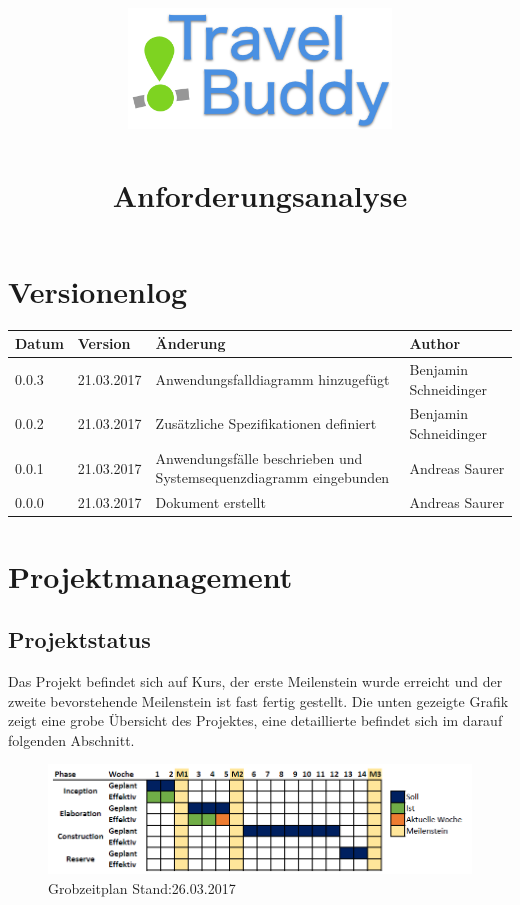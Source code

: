 \documentclass[a4paper,10pt,xetex]{article}
\title{
  \includegraphics[width=7cm]{travel-buddy_white}\\[\bigskipamount]\\
  Anforderungsanalyse\\[\bigskipamount]
}
\author{\documentauthors}
\date{\parbox{\linewidth}{\centering%
  IT15TA ZH \hspace*{3cm} Gruppe 3\endgraf\bigskip
  \documentdate\endgraf
}}
\begin{document}
\maketitle
\newpage

{
\hypersetup{linkcolor=black}
\setcounter{tocdepth}{3}
\tableofcontents
}
\newpage

\section{Versionenlog}\label{versionenlog}

\tabulinesep=1.2mm

\begin{longtabu} to \textwidth { | l | l | X[l] | l | }
  \hline
  \textbf{Datum} & \textbf{Version} & \textbf{Änderung} & \textbf{Author} \\
  \hline
  \endhead

  0.0.3 & 21.03.2017 & Anwendungsfalldiagramm hinzugefügt & Benjamin Schneidinger\\
  \hline

  0.0.2 & 21.03.2017 & Zusätzliche Spezifikationen definiert & Benjamin Schneidinger\\
  \hline

  0.0.1 & 21.03.2017 & Anwendungsfälle beschrieben und Systemsequenzdiagramm eingebunden & Andreas Saurer\\
  \hline

  0.0.0 & 21.03.2017 & Dokument erstellt & Andreas Saurer\\
  \hline
\end{longtabu}
\newpage

\section{Projektmanagement}\label{projektmanagement}

\subsection{Projektstatus}\label{projektstatus}

Das Projekt befindet sich auf Kurs, der erste Meilenstein wurde erreicht
und der zweite bevorstehende Meilenstein ist fast fertig gestellt. Die
unten gezeigte Grafik zeigt eine grobe Übersicht des Projektes, eine
detaillierte befindet sich im darauf folgenden Abschnitt.

\begin{figure}
\centering
\includegraphics{Grobzeitplan_26.03.2017.png}
\caption{Grobzeitplan Stand:26.03.2017}
\end{figure}
\end{document}
